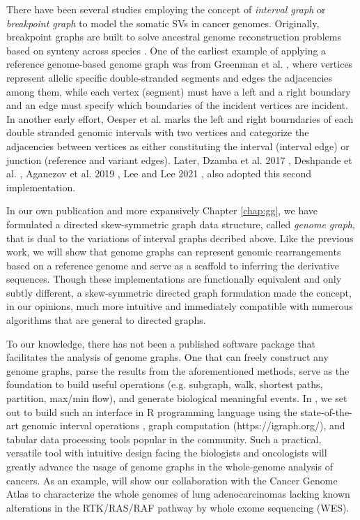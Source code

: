 \documentclass[phd,tocprelim]{cornell}
\begin{document}
There have been several studies employing the concept of \textit{interval graph} or \textit{breakpoint graph} to model the somatic SVs in cancer genomes. Originally, breakpoint graphs are built to solve ancestral genome reconstruction problems based on synteny across species \cite{Alekseyev2009-fw,Avdeyev2016-un}. One of the earliest example of applying a reference genome-based genome graph was from Greenman et al. \cite{Greenman:2012eg}, where vertices represent allelic specific double-stranded segments and edges the adjacencies among them, while each vertex (segment) must have a left and a right boundary and an edge must specify which boundaries of the incident vertices are incident. In another early effort, Oesper et al. \cite{Oesper2012-vw} marks the left and right bourndaries of each double stranded genomic intervals with two vertices and categorize the adjacencies between vertices as either constituting the interval (interval edge) or junction (reference and variant edges). Later, Dzamba et al. 2017 \cite{Dzamba2017-wo}, Deshpande et al. \cite{Deshpande2019-gs}, Aganezov et al. 2019 \cite{Aganezov2019-yh}, Lee and Lee 2021 \cite{Lee2021-rl}, also adopted this second implementation.
 
In our own publication \cite{Hadi2020-um} and more expansively Chapter \ref{chap:gg}, we have formulated a directed skew-symmetric graph data structure, called \textit{genome graph}, that is dual to the variations of interval graphs decribed above. Like the previous work, we will show that genome graphs can represent genomic rearrangements based on a reference genome and serve as a scaffold to inferring the derivative sequences. Though these implementations are functionally equivalent and only subtly different, a skew-symmetric directed graph formulation made the concept, in our opinions, much more intuitive and immediately compatible with numerous algorithms that are general to directed graphs.

To our knowledge, there has not been a published software package that facilitates the analysis of genome graphs. One that can freely construct any genome graphs, parse the results from the aforementioned methods, serve as the foundation to build useful operations (e.g. subgraph, walk, shortest paths, partition, max/min flow), and generate biological meaningful events. In , we set out to build such an interface in R programming language using the state-of-the-art genomic interval operations \cite{Lawrence2013-lh}, graph computation (https://igraph.org/), and tabular data processing tools popular in the community. Such a practical, versatile tool with intuitive design facing the biologists and oncologists will greatly advance the usage of genome graphs in the whole-genome analysis of cancers. As an example,  will show our collaboration with the Cancer Genome Atlas to characterize the whole genomes of lung adenocarcinomas lacking known alterations in the RTK/RAS/RAF pathway by whole exome sequencing (WES).
\end{document}
